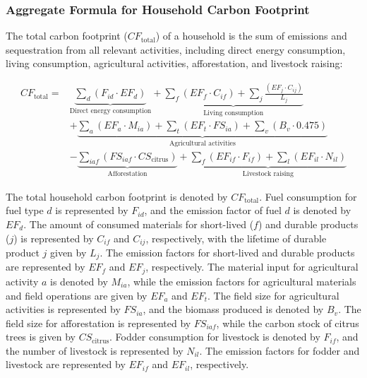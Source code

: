 \documentclass[12pt,a4paper]{article}
\begin{document}
\subsubsection*{Aggregate Formula for Household Carbon Footprint}

The total carbon footprint ($CF_{\text{total}}$) of a household is the sum of emissions and sequestration from all relevant activities, including direct energy consumption, living consumption, agricultural activities, afforestation, and livestock raising:

\begin{align}
CF_{\text{total}} = & \underbrace{\sum_d \left(F_{id} \cdot EF_d\right)}_{\text{Direct energy consumption}} + 
\underbrace{\sum_f \left(EF_f \cdot C_{if}\right) + \sum_j \frac{\left(EF_j \cdot C_{ij}\right)}{L_j}}_{\text{Living consumption}} \nonumber \\
& + \underbrace{\sum_a \left(EF_a \cdot M_{ia}\right) + \sum_t \left(EF_t \cdot FS_{ia}\right) + \sum_v \left(B_v \cdot 0.475\right)}_{\text{Agricultural activities}} \nonumber \\
& - \underbrace{\sum_{iaf} \left(FS_{iaf} \cdot CS_{\text{citrus}}\right)}_{\text{Afforestation}} +
\underbrace{\sum_f \left(EF_{if} \cdot F_{if}\right) + \sum_l \left(EF_{il} \cdot N_{il}\right)}_{\text{Livestock raising}}
\end{align}


The total household carbon footprint is denoted by $CF_{\text{total}}$. Fuel consumption for fuel type $d$ is represented by $F_{id}$, and the emission factor of fuel $d$ is denoted by $EF_d$. The amount of consumed materials for short-lived ($f$) and durable products ($j$) is represented by $C_{if}$ and $C_{ij}$, respectively, with the lifetime of durable product $j$ given by $L_j$. The emission factors for short-lived and durable products are represented by $EF_f$ and $EF_j$, respectively. The material input for agricultural activity $a$ is denoted by $M_{ia}$, while the emission factors for agricultural materials and field operations are given by $EF_a$ and $EF_t$. The field size for agricultural activities is represented by $FS_{ia}$, and the biomass produced is denoted by $B_v$. The field size for afforestation is represented by $FS_{iaf}$, while the carbon stock of citrus trees is given by $CS_{\text{citrus}}$. Fodder consumption for livestock is denoted by $F_{if}$, and the number of livestock is represented by $N_{il}$. The emission factors for fodder and livestock are represented by $EF_{if}$ and $EF_{il}$, respectively.
\end{document}
